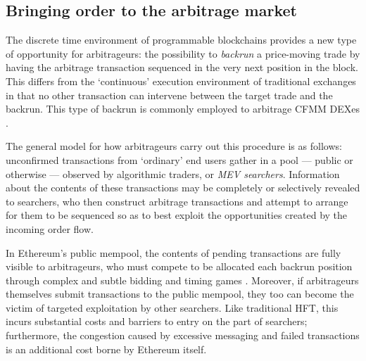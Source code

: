\subsection{Bringing order to the arbitrage market}

%
The discrete time environment of programmable blockchains provides a new type of opportunity for arbitrageurs: the possibility to \emph{backrun} a price-moving trade by having the arbitrage transaction sequenced in the very next position in the block.
%
This differs from the `continuous' execution environment of traditional exchanges in that no other transaction can intervene between the target trade and the backrun.
%
%
This type of backrun is commonly employed to arbitrage CFMM DEXes \cite{wang2022cyclic}.%

The general model for how arbitrageurs carry out this procedure is as follows: unconfirmed transactions from `ordinary' end users gather in a pool --- public or otherwise --- observed by algorithmic traders, or \emph{MEV searchers}.
%
Information about the contents of these transactions may be completely or selectively revealed to searchers, who then construct arbitrage transactions and attempt to arrange for them to be sequenced so as to best exploit the opportunities created by the incoming order flow.

In Ethereum's public mempool, the contents of pending transactions are fully visible to arbitrageurs, who must compete to be allocated each backrun position through complex and subtle bidding and timing games \cite{daian2020flash}.
%
Moreover, if arbitrageurs themselves submit transactions to the public mempool, they too can become the victim of targeted exploitation by other searchers.
%
Like traditional HFT, this incurs substantial costs and barriers to entry on the part of searchers; furthermore, the congestion caused by excessive messaging and failed transactions is an additional cost borne by Ethereum itself.

